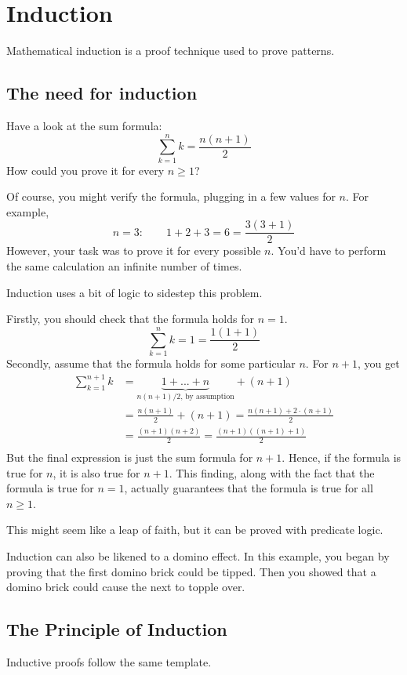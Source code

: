\documentclass{scrreprt}
\begin{document}
\section*{Induction}
Mathematical induction is a proof technique used to prove patterns.

\subsection*{The need for induction}

Have a look at the sum formula:
$$\sum_{k = 1}^n k = \frac{n(n + 1)}{2}$$
How could you prove it for every $n \geq 1$?

Of course, you might verify the formula, plugging in a few values for $n$. For example,
$$n = 3: \qquad 1 + 2 + 3 = 6 = \frac{3(3 + 1)}{2}$$
However, your task was to prove it for every possible $n$. You'd have to perform the same calculation an infinite number of times.

Induction uses a bit of logic to sidestep this problem.

Firstly, you should check that the formula holds for $n = 1$.
$$\sum_{k = 1}^n k = 1 = \frac{1(1 + 1)}{2}$$
Secondly, assume that the formula holds for some particular $n$. For $n + 1$, you get
\begin{align*}
    \sum_{k = 1}^{n + 1} k &= \underbrace{1 + ... + n}_{n(n + 1)/2 \text{, by assumption}} + (n + 1) \\
    &= \frac{n(n + 1)}{2} + (n + 1) = \frac{n(n + 1) + 2 \cdot (n + 1)}{2}\\
    &= \frac{(n + 1)(n + 2)}{2} = \frac{(n + 1)((n + 1) + 1)}{2} \\
\end{align*}
But the final expression is just the sum formula for $n + 1$. Hence, if the formula is true for $n$, it is also true for $n + 1$. This finding, along with the fact that the formula is true for $n = 1$, actually guarantees that the formula is true for all $n \geq 1$.

This might seem like a leap of faith, but it can be proved with predicate logic.

Induction can also be likened to a domino effect.  In this example, you began by proving that the first domino brick could be tipped. Then you showed that a domino brick could cause the next to topple over.

\subsection*{The Principle of Induction}
Inductive proofs follow the same template.
\end{document}

